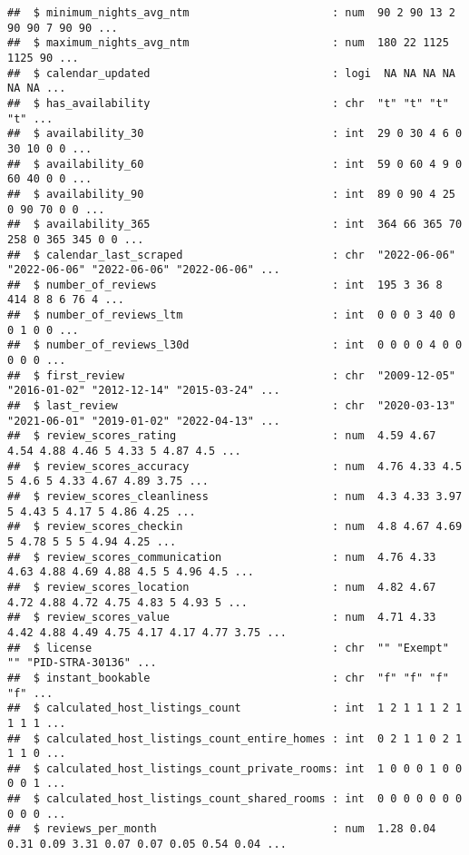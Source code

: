 \documentclass[
]{article}
\begin{document}
\begin{verbatim}
##  $ minimum_nights_avg_ntm                      : num  90 2 90 13 2 90 90 7 90 90 ...
##  $ maximum_nights_avg_ntm                      : num  180 22 1125 1125 90 ...
##  $ calendar_updated                            : logi  NA NA NA NA NA NA ...
##  $ has_availability                            : chr  "t" "t" "t" "t" ...
##  $ availability_30                             : int  29 0 30 4 6 0 30 10 0 0 ...
##  $ availability_60                             : int  59 0 60 4 9 0 60 40 0 0 ...
##  $ availability_90                             : int  89 0 90 4 25 0 90 70 0 0 ...
##  $ availability_365                            : int  364 66 365 70 258 0 365 345 0 0 ...
##  $ calendar_last_scraped                       : chr  "2022-06-06" "2022-06-06" "2022-06-06" "2022-06-06" ...
##  $ number_of_reviews                           : int  195 3 36 8 414 8 8 6 76 4 ...
##  $ number_of_reviews_ltm                       : int  0 0 0 3 40 0 0 1 0 0 ...
##  $ number_of_reviews_l30d                      : int  0 0 0 0 4 0 0 0 0 0 ...
##  $ first_review                                : chr  "2009-12-05" "2016-01-02" "2012-12-14" "2015-03-24" ...
##  $ last_review                                 : chr  "2020-03-13" "2021-06-01" "2019-01-02" "2022-04-13" ...
##  $ review_scores_rating                        : num  4.59 4.67 4.54 4.88 4.46 5 4.33 5 4.87 4.5 ...
##  $ review_scores_accuracy                      : num  4.76 4.33 4.5 5 4.6 5 4.33 4.67 4.89 3.75 ...
##  $ review_scores_cleanliness                   : num  4.3 4.33 3.97 5 4.43 5 4.17 5 4.86 4.25 ...
##  $ review_scores_checkin                       : num  4.8 4.67 4.69 5 4.78 5 5 5 4.94 4.25 ...
##  $ review_scores_communication                 : num  4.76 4.33 4.63 4.88 4.69 4.88 4.5 5 4.96 4.5 ...
##  $ review_scores_location                      : num  4.82 4.67 4.72 4.88 4.72 4.75 4.83 5 4.93 5 ...
##  $ review_scores_value                         : num  4.71 4.33 4.42 4.88 4.49 4.75 4.17 4.17 4.77 3.75 ...
##  $ license                                     : chr  "" "Exempt" "" "PID-STRA-30136" ...
##  $ instant_bookable                            : chr  "f" "f" "f" "f" ...
##  $ calculated_host_listings_count              : int  1 2 1 1 1 2 1 1 1 1 ...
##  $ calculated_host_listings_count_entire_homes : int  0 2 1 1 0 2 1 1 1 0 ...
##  $ calculated_host_listings_count_private_rooms: int  1 0 0 0 1 0 0 0 0 1 ...
##  $ calculated_host_listings_count_shared_rooms : int  0 0 0 0 0 0 0 0 0 0 ...
##  $ reviews_per_month                           : num  1.28 0.04 0.31 0.09 3.31 0.07 0.07 0.05 0.54 0.04 ...
\end{verbatim}
\end{document}
